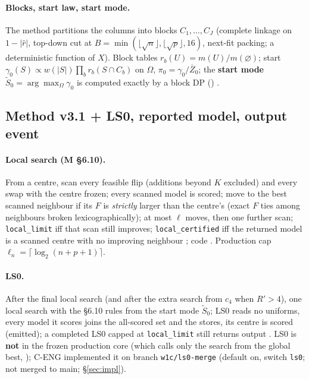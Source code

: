 \paragraph{Blocks, start law, start mode.} The method partitions the columns into blocks $C_1,\dots,C_J$ (complete linkage on $1-|\hat{r}|$, top-down cut at $B=\min(\lfloor\sqrt n\rfloor,\lfloor\sqrt p\rfloor,16)$, next-fit packing; a deterministic function of $X$). Block tables $r_b(U)=m(U)/m(\varnothing)$; start $\gamma_0(S)\propto w(|S|)\prod_b r_b(S\cap C_b)$ on $\Omega$, $\pi_0=\gamma_0/\bar{Z}_0$; the \textbf{start mode} $\tilde{S}_0=\arg\max_\Omega\gamma_0$ is computed exactly by a block DP () .

\subsection{Method v3.1 + LS0, reported model, output event}
\paragraph{Local search (M §6.10).} From a centre, scan every feasible flip (additions beyond $K$ excluded) and every swap with the centre frozen; every scanned model is scored; move to the best scanned neighbour if its $F$ is \emph{strictly} larger than the centre's (exact $F$ ties among neighbours broken lexicographically); at most $\ell$ moves, then one further scan; \texttt{local\_limit} iff that scan still improves; \texttt{local\_certified} iff the returned model is a scanned centre with no improving neighbour ; code . Production cap $\ell_n=\lceil\log_2(n+p+1)\rceil$.

\paragraph{LS0.} After the final local search (and after the extra search from $c_4$ when $R'>4$), one local search with the §6.10 rules from the start mode $\tilde{S}_0$; LS0 reads no uniforms, every model it scores joins the all-scored set and the stores, its centre is scored (emitted); a completed LS0 capped at \texttt{local\_limit} still returns output . LS0 is \textbf{not} in the frozen production core (which calls only the search from the global best, ); C-ENG implemented it on branch \texttt{w1c/ls0-merge} (default on, switch \texttt{ls0}; not merged to main; §\ref{sec:impl}).

